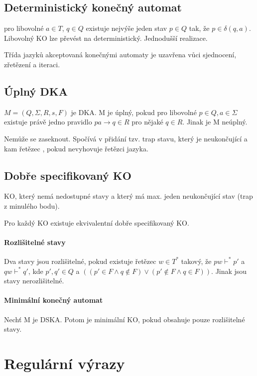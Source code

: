 \documentclass[a4paper, 11pt]{report}
\begin{document}
\subsection{Deterministický konečný automat}

pro libovolné $a \in T$, $q \in Q$ existuje nejvýše jeden stav $p \in Q$ tak, že $p \in \delta(q,a)$. Libovolný KO lze převést na deterministický. Jednodušší realizace.

Třída jazyků akceptovaná konečnými automaty je uzavřena vůci sjednocení, zřetězení a iteraci.

\subsection{Úplný DKA}

$M = (Q, \Sigma, R, s, F)$ je DKA. M je úplný, pokud pro libovolné $p \in Q, a \in \Sigma$ existuje právě jedno pravidlo $pa \to q \in R$ pro nějaké $q \in R$. Jinak je M neúplný.

Nemůže se zaseknout. Spočívá v přidání tzv. trap stavu, který je neukončující a kam řetězec , pokud nevyhovuje řetězci jazyka.

\subsection{Dobře specifikovaný KO}

KO, který nemá nedostupné stavy a který má max. jeden neukončující stav (trap z minulého bodu).

Pro každý KO existuje ekvivalentní dobře specifikovaný KO.

\paragraph{Rozlišitelné stavy}
Dva stavy jsou rozlišitelné, pokud existuje řetězec $w \in T^*$ takový, že $pw \vdash^* p'$ a $qw \vdash^* q'$, kde $p', q' \in Q$ a $((p' \in F \land q \notin F) \lor (p' \notin F \land q \in F))$. Jinak jsou stavy nerozlišitelné.

\paragraph{Minimální konečný automat}
Nechť M je DSKA. Potom je minimální KO, pokud obsahuje pouze rozlišitelné stavy.



\section{Regulární výrazy}
\end{document}
